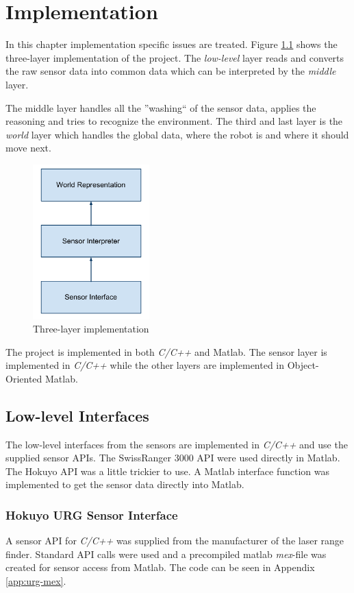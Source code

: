 
\chapter{Implementation}
\label{chap6}
In this chapter implementation specific issues are treated. Figure
\ref{chap6:fig-implementation} shows the three-layer implementation of the project.
The \emph{low-level} layer reads and converts the raw sensor data into common data which can be
interpreted by the \emph{middle} layer. 

The middle layer handles all the ''washing`` of the
sensor data, applies the reasoning and tries to recognize the environment. The third
and last layer is the \emph{world} layer which handles the global data, where the robot is
and where it should move next. 
\begin{figure}[htbp]
    \centering
    \includegraphics[width=0.4\textwidth]{pics/implementation}
    \caption{Three-layer implementation}
    \label{chap6:fig-implementation}
\end{figure}

The project is implemented in both \emph{C/C++} and Matlab. The sensor layer is 
implemented in \emph{C/C++} while the other layers are implemented in Object-Oriented
Matlab.

\section{Low-level Interfaces}
The low-level interfaces from the sensors are implemented in \emph{C/C++} and use the
supplied sensor APIs. The SwissRanger 3000 API were used directly in Matlab. The Hokuyo
API was a little trickier to use. A Matlab interface function was implemented to get
the sensor data directly into Matlab.

\subsection{Hokuyo URG Sensor Interface}
A sensor API for \emph{C/C++} was supplied from the manufacturer of the laser range
finder. Standard API calls were used and a precompiled matlab \emph{mex}-file was created
for sensor access from Matlab. The code can be seen in Appendix \ref{app:urg-mex}.

